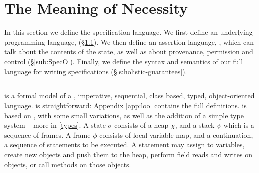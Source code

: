 \section{The Meaning of Necessity}
\label{s:semantics}

 
In this section we define {the}  \Nec specification language.  
We first define an underlying programming language, \Loo (\S \ref{sub:Loo}).
We then define an assertion language, \SpecO, which can talk about the
contents of the state, as well as about provenance, permission and
control (\S \ref{sub:SpecO}).  Finally, we define the syntax and
semantics of our full language for writing \Nec
specifications (\S \ref{s:holistic-guarantees}).


\subsection{\Loo}
\label{sub:Loo} 
 \Loo is a formal model of a , imperative, sequential, 
class based, typed, object-oriented language.
\Loo is straightforward:
Appendix \ref{app:loo} contains 
the full definitions.
\Loo is based on \LangOO 
\cite{FASE}, with some small variations, as well as 
the addition of  %
 a simple type system -- more in \ref{types}.
%
%
A \Loo state $\sigma$ consists of a 
heap $\chi$, and a  {stack $\psi$ which is a sequence of frames}.
A frame $\phi$ consists of
local variable map, and a continuation, \ie a sequence of statements to be executed.
 A statement may assign to variables, create new objects and push them to the heap, 
perform field reads and writes on objects,  or
 call methods on those objects. 

